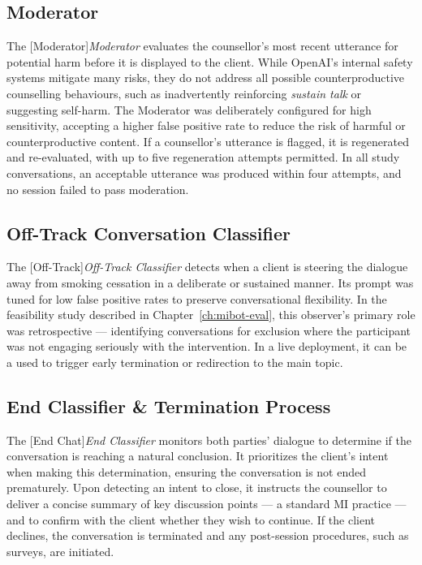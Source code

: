 \subsection{Moderator}
The [Moderator]\textit{Moderator} evaluates the counsellor's most recent utterance for potential harm before it is displayed to the client. While OpenAI's internal safety systems mitigate many risks, they do not address all possible counterproductive counselling behaviours, such as inadvertently reinforcing \emph{sustain talk} or suggesting self-harm. The Moderator was deliberately configured for high sensitivity, accepting a higher false positive rate to reduce the risk of harmful or counterproductive content. If a counsellor's utterance is flagged, it is regenerated and re-evaluated, with up to five regeneration attempts permitted. In all study conversations, an acceptable utterance was produced within four attempts, and no session failed to pass moderation.

\subsection{Off-Track Conversation Classifier}
The [Off-Track]\textit{Off-Track Classifier} detects when a client is steering the dialogue away from smoking cessation in a deliberate or sustained manner. Its prompt was tuned for low false positive rates to preserve conversational flexibility. In the feasibility study described in Chapter~\ref{ch:mibot-eval}, this observer's primary role was retrospective --- identifying conversations for exclusion where the participant was not engaging seriously with the intervention. In a live deployment, it can be a used to trigger early termination or redirection to the main topic.

\subsection{End Classifier \& Termination Process}
The [End Chat]\textit{End Classifier} monitors both parties' dialogue to determine if the conversation is reaching a natural conclusion. It prioritizes the client's intent when making this determination, ensuring the conversation is not ended prematurely. Upon detecting an intent to close, it instructs the counsellor to deliver a concise summary of key discussion points --- a standard MI practice --- and to confirm with the client whether they wish to continue. If the client declines, the conversation is terminated and any post-session procedures, such as surveys, are initiated.


